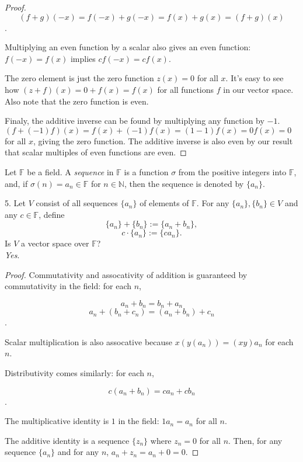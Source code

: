 \documentclass[12pt]{article} %
\newcommand{\N}{\mathbb{N}}
\newcommand{\F}{\mathbb{F}}
\begin{document}
\begin{flushleft}
\begin{proof}
$$(f+g)(-x) = f(-x) + g(-x) = f(x) + g(x) = (f+g)(x)$$.

Multiplying an even function by a scalar also gives an even function: $f(-x) = f(x)$ implies $cf(-x) = cf(x)$.

The zero element is just the zero function $z(x)=0$ for all $x$. It's easy to see how $(z+f)(x) = 0 + f(x) = f(x)$ for all functions $f$ in our vector space. Also note that the zero function is even.

Finaly, the additive inverse can be found by multiplying any function by $-1$. $(f + (-1)f)(x) = f(x) + (-1)f(x) = (1-1)f(x) = 0f(x) = 0$ for all $x$, giving the zero function. The additive inverse is also even by our result that scalar multiples of even functions are even.


\end{proof}


\newpage%
\vspace{1cm}

Let $\F$ be a field.  A \textit{sequence} in $\F$ is a function $\sigma$ from the positive integers into $\F$, and, if $\sigma(n) = a_n \in \F$ for $n \in \N$, then the sequence is denoted by $\{a_n\}$.\\

\vspace{.5cm}

5.  Let $V$ consist of all sequences $\{a_n\}$ of elements of $\F$.  For any $\{a_n\}, \{b_n\} \in V$ and any $c \in \F$, define
\[ \{a_n\} + \{b_n\} := \{a_n + b_n\}, \]
\[ c \cdot \{a_n\} := \{ca_n\}.\]
Is $V$ a vector space over $\F$?\\
\vspace{0.5cm}
\textit{Yes}.

\begin{proof}
  Commutativity and assocativity of addition is guaranteed by commutativity in the field: for each $n$,
  
  $$a_n + b_n = b_n + a_n$$
  $$a_n + (b_n + c_n) = (a_n + b_n) + c_n$$.

  Scalar multiplication is also assocative because $x(y(a_n)) = (xy)a_n$ for each $n$.

  Distributivity comes similarly: for each $n$, 

  $$c(a_n + b_n) = ca_n + cb_n$$.

  The multiplicative identity is $1$ in the field: $1a_n = a_n$ for all $n$.

  The additive identity is a sequence $\{z_n\}$ where $z_n = 0$ for all $n$. Then, for any sequence $\{a_n\}$ and for any $n$, $a_n + z_n = a_n + 0 = 0$.


\end{proof}
\end{flushleft}
\end{document}
